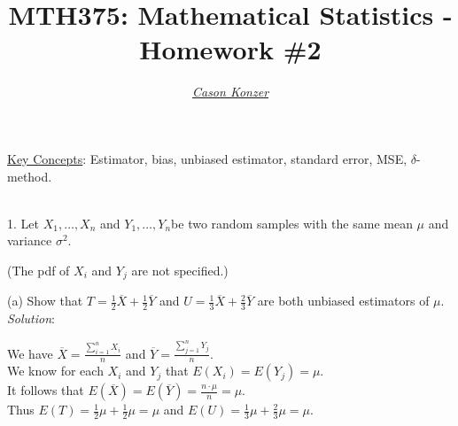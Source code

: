 \documentclass[12pt]{article}
\newcommand{\XB}{\color{black}}
\newcommand{\XBB}{\color{blue}}
\newcommand{\XV}{\color{violet}}
\begin{document}
\title{\textbf{MTH375}: Mathematical Statistics - Homework \#2}
\date{}
\author{\XV\textit{\large{\href{https://github.com/casonk}{Cason Konzer}}}\XB}

\maketitle
\hrulefill
\vfill 
    \underline{Key Concepts}:  Estimator, bias, unbiased estimator, standard error, MSE, $\delta$-method.

\newpage
\newpage
\XBB\hrulefill\XB \\

1. Let $ X_{1}, \dots , X_{n} $ and $ Y_{1}, \dots , Y_{n} $be two random samples with the same mean $ \mu $ and variance $ \sigma^2 $.

(The pdf of $ X_{i} $ and $ Y_{j} $ are not specified.)

\XBB\hrulefill\XB 
\vspace{5mm}


(a) Show that $ T = \frac{1}{2}\overline{X} + \frac{1}{2}\overline{Y} $ and $ U = \frac{1}{3}\overline{X} + \frac{2}{3}\overline{Y} $ are both unbiased estimators of $ \mu $.
\vspace{2.5mm} \\
\textit{Solution}:
\vspace{2.5mm}

\noindent
We have $ \displaystyle \overline{X} = \frac{\sum_{i=1}^{n} X_{i}}{n} $ and $ \displaystyle \overline{Y} = \frac{\sum_{j=1}^{n} Y_{j}}{n} $. \\

\noindent
We know for each $ X_{i} $ and $ Y_{j} $ that $ E(X_{i}) = E(Y_{j}) = \mu $. \\

\noindent
It follows that $ \displaystyle E(\overline{X}) = E(\overline{Y}) = \frac{n \cdot \mu}{n} = \mu $. \\

\noindent
Thus $ \displaystyle E(T) = \frac{1}{2}\mu + \frac{1}{2}\mu = \mu $ and $ \displaystyle  E(U) = \frac{1}{3}\mu + \frac{2}{3}\mu = \mu $. \\
\end{document}
